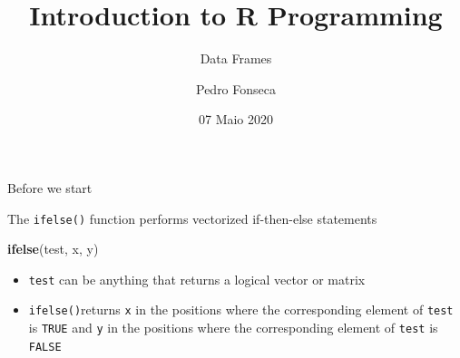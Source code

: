 \documentclass[ignorenonframetext,]{beamer}
\title{Introduction to R Programming}
\subtitle{Data Frames}
\author{Pedro Fonseca}
\date{07 Maio 2020}
\newenvironment{Shaded}{\begin{snugshade}}{\end{snugshade}}
\newcommand{\KeywordTok}[1]{\textcolor[rgb]{0.13,0.29,0.53}{\textbf{#1}}}
\newcommand{\NormalTok}[1]{#1}
\begin{document}
\frame{\titlepage}

\begin{frame}[fragile]{Before we start}
\protect\hypertarget{before-we-start}{}

The \texttt{ifelse()} function performs vectorized if-then-else
statements

\begin{Shaded}
\begin{Highlighting}[]
\KeywordTok{ifelse}\NormalTok{(test, x, y)}
\end{Highlighting}
\end{Shaded}

\begin{itemize}
\item
  \texttt{test} can be anything that returns a logical vector or matrix
\item
  \texttt{ifelse()}returns \texttt{x} in the positions where the
  corresponding element of \texttt{test} is \texttt{TRUE} and \texttt{y}
  in the positions where the corresponding element of \texttt{test} is
  \texttt{FALSE}
\end{itemize}

\end{frame}
\end{document}
